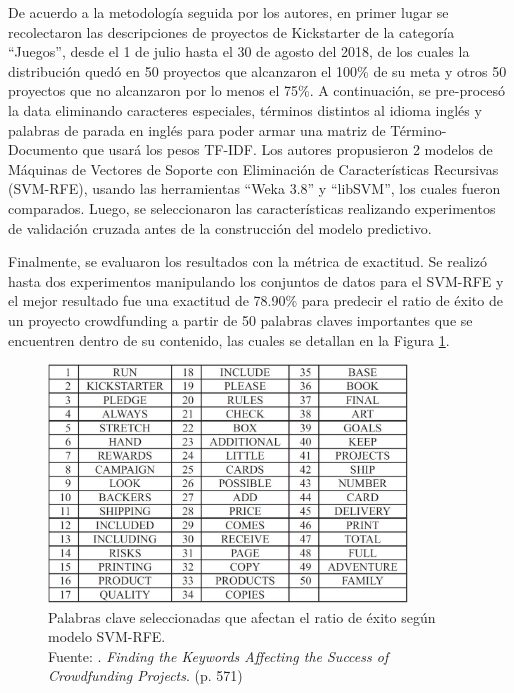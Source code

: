 De acuerdo a la metodología seguida por los autores, en primer lugar se recolectaron las descripciones de proyectos de Kickstarter de la categoría “Juegos”, desde el 1 de julio hasta el 30 de agosto del 2018, de los cuales la distribución quedó en 50 proyectos que alcanzaron el 100\% de su meta y otros 50 proyectos que no alcanzaron por lo menos el 75\%. A continuación, se pre-procesó la data eliminando caracteres especiales, términos distintos al idioma inglés y palabras de parada en inglés para poder armar una matriz de Término-Documento que usará los pesos TF-IDF. Los autores propusieron 2 modelos de Máquinas de Vectores de Soporte con Eliminación de Características Recursivas (SVM-RFE), usando las herramientas “Weka 3.8” y “libSVM”, los cuales fueron comparados. Luego, se seleccionaron las características realizando experimentos de validación cruzada antes de la construcción del modelo predictivo. 

Finalmente, se evaluaron los resultados con la métrica de exactitud.
Se realizó hasta dos experimentos manipulando los conjuntos de datos para el SVM-RFE y el mejor resultado fue una exactitud de 78.90\% para predecir el ratio de éxito de un proyecto crowdfunding a partir de 50 palabras claves importantes que se encuentren dentro de su contenido, las cuales se detallan en la Figura \ref{2:fig126}.

\begin{figure}[!ht]
	\begin{center}
		\includegraphics[width=0.85\textwidth]{2/figures/chen2019.jpg}
		\caption[Palabras clave seleccionadas que afectan el ratio de éxito según modelo SVM-RFE]{Palabras clave seleccionadas que afectan el ratio de éxito según modelo SVM-RFE.\\
		Fuente: \cite{pr_chen2019keywords_crowdfunding}. \textit{Finding the Keywords Affecting the Success of Crowdfunding Projects}. (p. 571)}
		\label{2:fig126}
	\end{center}
\end{figure}

